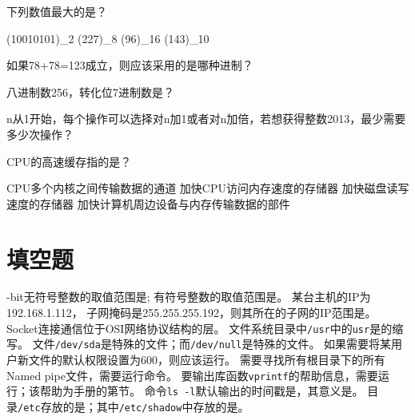 \documentclass[addpoints,12pt,answers]{exam}
\begin{document}
\begin{CJK*}{UTF8}{gbsn}
\begin{questions}
\question[2]
下列数值最大的是？
\begin{choices}
	\choice (10010101)\_2
	\choice (227)\_8
	\choice (96)\_16
	\choice (143)\_10
\end{choices}
\answerline

\question[2]
如果78+78=123成立，则应该采用的是哪种进制？
\begin{choices}
\end{choices}
\answerline


\question[2]
八进制数256，转化位7进制数是？
\begin{choices}
\end{choices}
\answerline

\question[2]
n从1开始，每个操作可以选择对n加1或者对n加倍，若想获得整数2013，最少需要多少次操作？
\begin{choices}
\end{choices}
\answerline


\question[2]
CPU的高速缓存指的是？
\begin{choices}
	\choice CPU多个内核之间传输数据的通道
	\choice 加快CPU访问内存速度的存储器
	\choice 加快磁盘读写速度的存储器
	\choice 加快计算机周边设备与内存传输数据的部件
\end{choices}
\answerline
\end{questions}

\newpage

\section{填空题}

\begin{questions}
	-bit无符号整数的取值范围是\fillin[]; 有符号整数的取值范围是\fillin[][1in]。
	\question[2] 某台主机的IP为192.168.1.112， 子网掩码是255.255.255.192，则其所在的子网的IP范围是\fillin[][1in]。
	\question[2] Socket连接通信位于OSI网络协议结构的\fillin[]层。
	\question[2] 文件系统目录中\texttt{/usr}中的\texttt{usr}是\fillin[][1in]的缩写。
	\question[2] 文件\texttt{/dev/sda}是特殊的\fillin[][1in]文件；而\texttt{/dev/null}是特殊的\fillin[][1in]文件。
	\question[2] 如果需要将某用户新文件的默认权限设置为600，则应该运行\fillin[][1in]。
	\question[2] 需要寻找所有根目录下的所有Named pipe文件，需要运行命令\fillin[][1in]。
	\question[2] 要输出库函数\texttt{vprintf}的帮助信息，需要运行\fillin[][1in]；该帮助为手册的第\fillin[]节。
	\question[2] 命令\texttt{ls -l}默认输出的时间戳是\fillin[]，其意义是\fillin[][2in]。
	\question[2] 目录\texttt{/etc}存放的是\fillin[][2in]；其中\texttt{/etc/shadow}中存放的是\fillin[][2in]。
\end{questions}

\end{CJK*}
\end{document}
